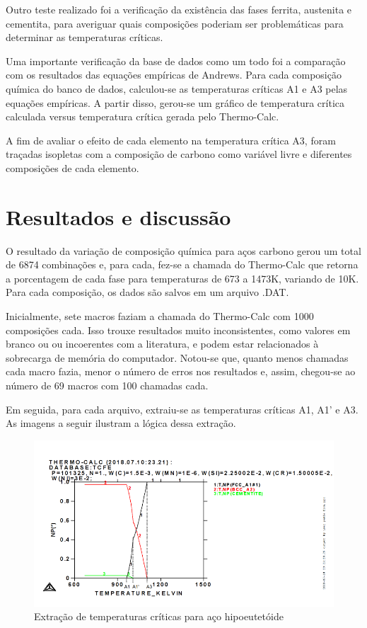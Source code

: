 \documentclass[brazil,tese,epusp]{usp}
\begin{document}
Outro teste realizado foi a verificação da existência das fases ferrita, austenita e cementita, para averiguar quais composições poderiam ser problemáticas para determinar as temperaturas críticas.

Uma importante verificação da base de dados como um todo foi a comparação com os resultados das equações empíricas de Andrews. Para cada composição química do banco de dados, calculou-se as temperaturas críticas A1 e A3 pelas equações empíricas. A partir disso, gerou-se um gráfico de temperatura crítica calculada versus temperatura crítica gerada pelo Thermo-Calc\textregistered{}.

A fim de avaliar o efeito de cada elemento na temperatura crítica A3, foram traçadas isopletas com a composição de carbono como variável livre e diferentes composições de cada elemento.


\chapter{Resultados e discussão}

O resultado da variação de composição química para aços carbono gerou um total de 6874 combinações e, para cada, fez-se a chamada do Thermo-Calc\textregistered{} que retorna a porcentagem de cada fase para temperaturas de 673 a 1473K, variando de 10K. Para cada composição, os dados são salvos em um arquivo .DAT.

Inicialmente, sete macros faziam a chamada do Thermo-Calc\textregistered{} com 1000 composições cada. Isso trouxe resultados muito inconsistentes, como valores em branco ou ou incoerentes com a literatura, e podem estar relacionados à sobrecarga de memória do computador. Notou-se que, quanto menos chamadas cada macro fazia, menor o número de erros nos resultados e, assim, chegou-se ao número de 69 macros com 100 chamadas cada.

Em seguida, para cada arquivo, extraiu-se as temperaturas críticas A1, A1' e A3. As imagens a seguir ilustram a lógica dessa extração.

\begin{figure}
  \includegraphics[width=.9\textwidth]{img/714editado.png}
  \caption{Extração de temperaturas críticas para aço hipoeutetóide}
  \label{fig:Tcrit_liga_hipo}
\end{figure}
\end{document}
